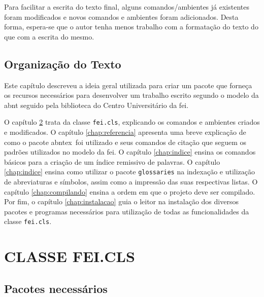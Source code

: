 \documentclass{fei}
\begin{document}
Para facilitar a escrita do texto final, alguns comandos/ambientes já existentes foram modificados e novos comandos e ambientes foram adicionados. Desta forma, espera-se que o autor tenha menos trabalho com a formatação do texto do que com a escrita do mesmo.

\section{Organização do Texto}

Este capítulo descreveu a ideia geral utilizada para criar um pacote que forneça os recursos necessários para desenvolver um trabalho escrito segundo o modelo da \gls{abnt} seguido pela biblioteca do Centro Universitário da \gls{fei}.

O capítulo \ref{chap:classe} trata da classe \texttt{fei.cls}, explicando os comandos e ambientes criados e modificados. O capítulo \ref{chap:referencia} apresenta uma breve explicação de como o pacote \gls{abntex}~foi utilizado e seus comandos de citação que seguem os padrões utilizados no modelo da \gls{fei}. O capítulo \ref{chap:indice} ensina os comandos básicos para a criação de um índice remissivo de palavras. O capítulo \ref{chap:indice} ensina como utilizar o pacote \texttt{glossaries} na indexação e utilização de abreviaturas e símbolos, assim como a impressão das suas respectivas listas. O capítulo \ref{chap:compilando} ensina a ordem em que o projeto deve ser compilado. Por fim, o capítulo \ref{chap:instalacao} guia o leitor na instalação dos diversos pacotes e programas necessários para utilização de todas as funcionalidades da classe \texttt{fei.cls}.

\chapter{CLASSE FEI.CLS}\label{chap:classe}

\section{Pacotes necessários}\label{sec:pacotes}
    
\end{document}
